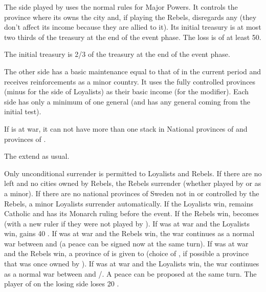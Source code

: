 \phadm
\aparag The side played by \SUE uses the normal rules for Major Powers. It
controls the province where its owns the city and, if playing the Rebels,
disregards any \REVOLT (they don't affect its income because they are allied
to it).
\bparag Its initial treasury is at most two thirds of the treasury at the end
of the event phase. The loss is of at least 50\ducats.
\begin{oldcompta}
  \bparag The initial treasury is 2/3 of the treasury at the end of the event
  phase.
\end{oldcompta}
\aparag The other side has a basic maintenance equal to that of \SUE in the
current period and receives reinforcements as a minor country.  It uses the
fully controlled provinces (minus \REVOLT for the side of Loyalists) as their
basic income (for the modifier).
\aparag Each side has only a minimum of one general (and has any general
coming from the initial test).

\phmil
\aparag If \POL is at war, it can not have more than one stack in National
provinces of \paysmajeurSuede and provinces of \regionNorvege.

\phinter
\aparag The \REVOLT extend as usual.

\phpaix
\aparag Only unconditional surrender is permitted to Loyalists and Rebels. If
there are no \REVOLT left and no cities owned by Rebels, the Rebels surrender
(whether played by \SUE or as a minor).  If there are no national provinces of
Sweden not in \REVOLT or controlled by the Rebels, a minor Loyalists surrender
automatically.
\bparag If the Loyalists win, \SUE remains Catholic and has its Monarch ruling
before the event.
\bparag If the Rebels win, \SUE becomes \PROTTOL (with a new ruler if they
were not played by \SUE).
\bparag If \POL was at war and the Loyalists win, \POL gains 40 \PV.
\bparag If \POL was at war and the Rebels win, the war continues as a normal
war between \POL and \SUE (a peace can be signed now at the same turn).
\bparag If \DANdan was at war and the Rebels win, a province of \SUE is given
to \DANdan (choice of \SUE, if possible a province that was once owned by
\DANdan).
\bparag If \DANdan was at war and the Loyalists win, the war continues as a
normal war between \DANdan and \POL/\SUE.  A peace can be proposed at the same
turn.
\aparag The player of \SUE on the losing side loses 20 \PV.




